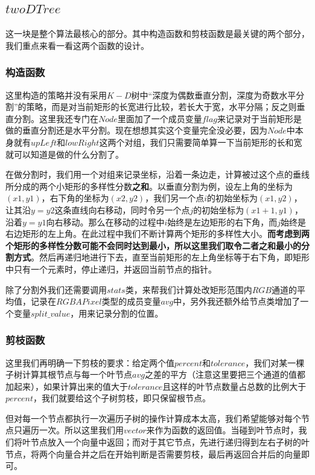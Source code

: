\documentclass[UTF8]{ctexart}
\begin{document}
		\subsection{$twoDTree$}\label{twoDTree}
		
		\indent 这一块是整个算法最核心的部分。其中构造函数和剪枝函数是最关键的两个部分，我们重点来看一看这两个函数的设计。
		
		\subsubsection{构造函数}
		\indent 这里构造的策略并没有采用$K-D$树中“深度为偶数垂直分割，深度为奇数水平分割”的策略，而是对当前矩形的长宽进行比较，若长大于宽，水平分隔；反之则垂直分割。这里我还专门在$Node$里面加了一个成员变量$flag$来记录对于当前矩形是做的垂直分割还是水平分割。现在想想其实这个变量完全没必要，因为$Node$中本身就有$upLeft$和$lowRight$这两个对组，我们只需要简单算一下当前矩形的长和宽就可以知道是做的什么分割了。
		
		\indent 在做分割时，我们用一个对组来记录坐标，沿着一条边走，计算被过这个点的垂线所分成的两个小矩形的多样性分数\textbf{之和}。以垂直分割为例，设左上角的坐标为$(x1, y1)$，右下角的坐标为$(x2, y2)$，我们另一个点$i$的初始坐标为$(x1, y2)$，让其沿$y = y2$这条直线向右移动，同时令另一个点$j$的初始坐标为$(x1+1, y1)$，沿着$y = y1$向右移动。那么在移动的过程中$i$始终是左边矩形的右下角，而$j$始终是右边矩形的左上角。在此过程中我们不断计算两个矩形的多样性大小。\textbf{而考虑到两个矩形的多样性分数可能不会同时达到最小，所以这里我们取令二者之和最小的分割方式}。然后再递归地进行下去，直至当前矩形的左上角坐标等于右下角，即矩形中只有一个元素时，停止递归，并返回当前节点的指针。
		
		\indent 除了分割外我们还需要调用$stats$类，来帮我们计算处改矩形范围内$RGB$通道的平均值，记录在$RGBAPixel$类型的成员变量$avg$中，另外我还额外给节点类增加了一个变量$split\_value$，用来记录分割的位置。
		
		\subsubsection{剪枝函数}
		\indent 这里我们再明确一下剪枝的要求：\textcolor[rgb]{0.8,0.1,0.1}{给定两个值$percent$和$tolerance$，我们对某一棵子树计算其根节点与每一个叶节点$avg$之差的平方（注意这里要把三个通道的值都加起来），如果计算出来的值大于$tolerance$且这样的叶节点数量占总数的比例大于$percent$，我们就要给这个子树剪枝，即只保留根节点}。
		
		\indent 但对每一个节点都执行一次遍历子树的操作计算成本太高，我们希望能够对每个节点只遍历一次。所以这里我们用$vector$来作为函数的返回值。当碰到叶节点时，我们将叶节点放入一个向量中返回；而对于其它节点，先进行递归得到左右子树的叶节点，将两个向量合并之后在开始判断是否需要剪枝，最后再返回合并后的向量即可。
		
\end{document}
